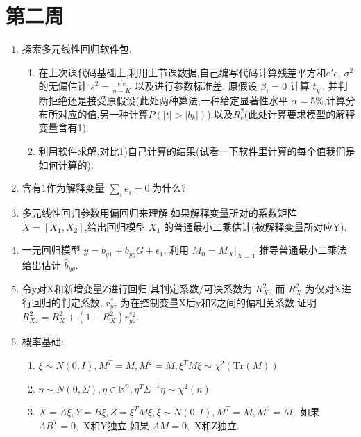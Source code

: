 \section{第二周}
\begin{enumerate}


\item 探索多元线性回归软件包.
\begin{enumerate}

    \item 在上次课代码基础上,利用上节课数据,自己编写代码计算残差平方和$e'e$, $\sigma^{2}$的无偏估计 $s^{2}=\frac{e^{\prime}e}{n-K}$ 以及进行参数标准差, 原假设 $\beta_i=0$ 计算 $t_{k^{\prime}}$, 并判断拒绝还是接受原假设(此处两种算法,一种给定显著性水平 $\alpha=5\%$,计算分布所对应的值,另一种计算$P(|t|>|b_k|)$).以及$R_{c}^{2}$(此处计算要求模型的解释变量含有1). 
    \item 利用软件求解,对比1)自己计算的结果(试看一下软件里计算的每个值我们是如何计算的). 
\end{enumerate}

\item 含有1作为解释变量 $\sum_{i} e_{i}=0$,为什么? 

\item 多元线性回归参数用偏回归来理解:如果解释变量所对的系数矩阵 $X=[X_{1},X_{2}]$,给出回归模型 $X_{1}$ 的普通最小二乘估计(被解释变量所对应Y).

\item 一元回归模型 $y=b_{y1}+b_{yg}G+\epsilon_{1}$, 利用 $M_{0}=M_{X}|_{X=\boldsymbol{1}}$ 推导普通最小二乘法给出估计 $\hat{b}_{yg}$. 
\item 令y对X和新增变量Z进行回归,其判定系数/可决系数为 $R_{Xz}^{2}$ 而 $R_{X}^{2}$ 为仅对X进行回归的判定系数, $r_{yz}^{*}$ 为在控制变量X后y和Z之间的偏相关系数,证明 $R_{Xz}^{2}=R_{X}^{2}+(1-R_{X}^{2})r_{yz}^{*2}$.

\item 概率基础: \\
\begin{enumerate}

    \item $\xi\sim N(0,I), M^{T}=M, M^{2}=M, \xi^{T}M\xi\sim\chi^{2}(\text{Tr}(M))$ 
    \item $\eta\sim N(0,\Sigma), \eta\in \mathbb{R}^{n}, \eta^{T}\Sigma^{-1}\eta\sim\chi^{2}(n)$ 
    \item $X=A\xi, Y=B\xi, Z=\xi^{T}M\xi, \xi\sim N(0,I), M^{T}=M, M^{2}=M,$ 如果 $AB^{T}=0,$ X和Y独立,如果 $AM=0,$ X和Z独立. 
\end{enumerate}

\end{enumerate}

